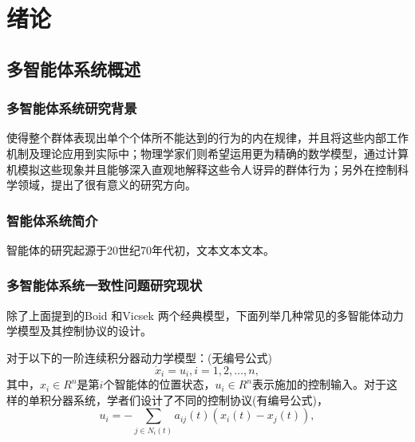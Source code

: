\chapter{绪论}
\section{多智能体系统概述}
\subsection{多智能体系统研究背景}
使得整个群体表现出单个个体所不能达到的行为的内在规律，并且将这些内部工作机制及理论应用到实际中；物理学家们则希望运用更为精确的数学模型，通过计算机模拟这些现象并且能够深入直观地解释这些令人讶异的群体行为；另外在控制科学领域，\cite{洪奕光2011多智能体系统动态协调与分布式控制设计,olfati2007consensus,savkin2004coordinated}提出了很有意义的研究方向。
\subsection{智能体系统简介}
智能体的研究起源于20世纪70年代初，文本文本文本。
\subsection{多智能体系统一致性问题研究现状}
除了上面提到的Boid 和Vicsek 两个经典模型，下面列举几种常见的多智能体动力学模型及其控制协议的设计。

对于以下的一阶连续积分器动力学模型：(无编号公式)
\[\dot{x}_i=u_i, i=1,2,\ldots,n,
\]
其中，$x_i\in R^n$是第$i$个智能体的位置状态，$u_i\in R^n$表示施加的控制输入。对于这样的单积分器系统，学者们设计了不同的控制协议(有编号公式)，
\begin{equation}
u_i=-\sum_{j\in N_i(t)}a_{ij}(t)(x_i(t)-x_j(t)),
\end{equation}

